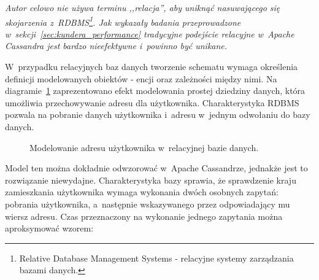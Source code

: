 \emph{Autor celowo nie używa terminu ,,relacja'', aby uniknąć nasuwającego się skojarzenia z~RDBMS\footnote{Relative Database Management Systems - relacyjne systemy zarządzania bazami danych.}. Jak wykazały badania przeprowadzone w~sekcji~\ref{sec:kundera_performance} tradycyjne podejście relacyjne w~Apache Cassandra jest bardzo nieefektywne i~powinno być unikane.}

W~przypadku relacyjnych baz danych tworzenie schematu wymaga określenia definicji modelowanych obiektów - encji oraz zależności między nimi. Na diagramie~\ref{fig:er_user_address} zaprezentowano efekt modelowania prostej dziedziny danych, która umożliwia przechowywanie adresu dla użytkownika. Charakterystyka RDBMS pozwala na pobranie danych użytkownika i~adresu w~jednym odwołaniu do bazy danych.

\begin{figure}[ht!]
	\centering

	\caption{Modelowanie adresu użytkownika w~relacyjnej bazie danych.}
	\label{fig:er_user_address}
\end{figure}

Model ten można dokładnie odwzorować w~Apache Cassandrze, jednakże jest to rozwiązanie niewydajne. Charakterystyka bazy sprawia, że sprawdzenie kraju zamieszkania użytkownika wymaga wykonania dwóch osobnych zapytań: pobrania użytkownika, a~następnie wskazywanego przez odpowiadający mu wiersz adresu. Czas przeznaczony na wykonanie jednego zapytania można aproksymować wzorem:


